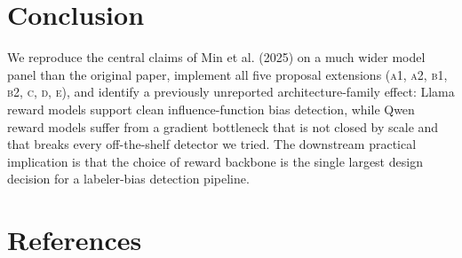 \documentclass[11pt,a4paper]{article}
\begin{document}
\section{Conclusion}

We reproduce the central claims of Min et al. (2025) on a much wider model panel than the
original paper, implement all five proposal extensions (\textsc{a1}, \textsc{a2}, \textsc{b1},
\textsc{b2}, \textsc{c}, \textsc{d}, \textsc{e}), and identify a previously unreported
architecture-family effect: Llama reward models support clean influence-function bias detection,
while Qwen reward models suffer from a gradient bottleneck that is not closed by scale and
that breaks every off-the-shelf detector we tried. The downstream practical implication is
that the choice of reward backbone is the single largest design decision for a labeler-bias
detection pipeline.

\section*{References}

\small
\end{document}

